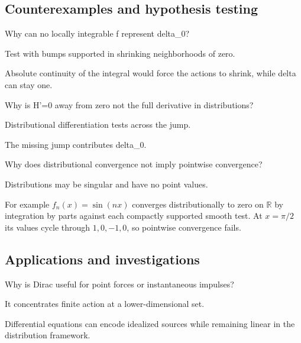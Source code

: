 \subsection*{Counterexamples and hypothesis testing}

\begin{exercise}\label{exr:iii16-expand-10}
Why can no locally integrable f represent delta\_0?
\end{exercise}
\begin{hint}
Test with bumps supported in shrinking neighborhoods of zero.
\end{hint}
\begin{solution}
Absolute continuity of the integral would force the actions to shrink, while delta can stay one.
\end{solution}

\begin{exercise}\label{exr:iii16-expand-11}
Why is H'=0 away from zero not the full derivative in distributions?
\end{exercise}
\begin{hint}
Distributional differentiation tests across the jump.
\end{hint}
\begin{solution}
The missing jump contributes delta\_0.
\end{solution}

\begin{exercise}\label{exr:iii16-expand-12}
Why does distributional convergence not imply pointwise convergence?
\end{exercise}
\begin{hint}
Distributions may be singular and have no point values.
\end{hint}
\begin{solution}
For example $f_n(x)=\sin(nx)$ converges distributionally to zero on $\mathbb R$ by integration by parts against each compactly supported smooth test. At $x=\pi/2$ its values cycle through $1,0,-1,0$, so pointwise convergence fails.
\end{solution}

\subsection*{Applications and investigations}

\begin{exercise}\label{exr:iii16-expand-13}
Why is Dirac useful for point forces or instantaneous impulses?
\end{exercise}
\begin{hint}
It concentrates finite action at a lower-dimensional set.
\end{hint}
\begin{solution}
Differential equations can encode idealized sources while remaining linear in the distribution framework.
\end{solution}

